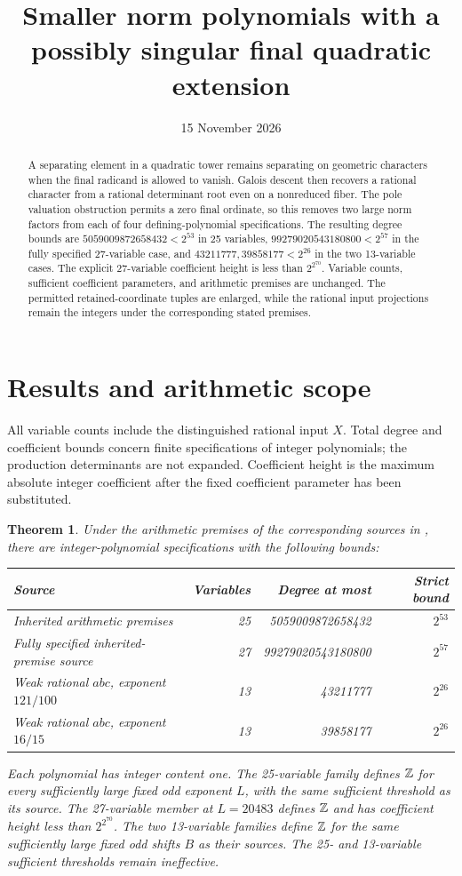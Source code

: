 \documentclass[11pt,a4paper]{article}
\title{Smaller norm polynomials with a possibly singular final quadratic extension}
\author{}\date{15 November 2026}
\newtheorem{theorem}{Theorem}[section]
\begin{document}
\maketitle
\begin{abstract}
A separating element in a quadratic tower remains separating on geometric
characters when the final radicand is allowed to vanish. Galois descent
then recovers a rational character from a rational determinant root even
on a nonreduced fiber. The pole valuation obstruction permits a zero final
ordinate, so this removes two large norm factors from each of four
defining-polynomial specifications. The resulting degree bounds are
$5059009872658432<2^{53}$ in 25 variables,
$99279020543180800<2^{57}$ in the fully specified 27-variable case,
and $43211777,39858177<2^{26}$ in the two 13-variable cases.
The explicit 27-variable coefficient height is less than $2^{2^{70}}$.
Variable counts, sufficient coefficient parameters, and arithmetic
premises are unchanged. The permitted retained-coordinate tuples are
enlarged, while the rational input projections remain the integers under
the corresponding stated premises.
\end{abstract}

\section{Results and arithmetic scope}
All variable counts include the distinguished rational input $X$.
Total degree and coefficient bounds concern finite specifications of
integer polynomials; the production determinants are not expanded.
Coefficient height is the maximum absolute integer coefficient after
the fixed coefficient parameter has been substituted.

\begin{theorem}\label{thm:main}
Under the arithmetic premises of the corresponding sources in
\cite{Unit,Subalgebra}, there are integer-polynomial specifications with
the following bounds:
\begin{center}\small
\begin{tabular}{lrrr}\toprule
Source & Variables & Degree at most & Strict bound\\\midrule
Inherited arithmetic premises &25&5059009872658432&$2^{53}$\\
Fully specified inherited-premise source &27&99279020543180800&$2^{57}$\\
Weak rational $abc$, exponent $121/100$ &13&43211777&$2^{26}$\\
Weak rational $abc$, exponent $16/15$ &13&39858177&$2^{26}$\\\bottomrule
\end{tabular}
\end{center}
Each polynomial has integer content one. The 25-variable family defines
$\mathbb Z$ for every sufficiently large fixed odd exponent $L$, with the same
sufficient threshold as its source. The 27-variable member at $L=20483$
defines $\mathbb Z$ and has coefficient height less than $2^{2^{70}}$.
The two 13-variable families define $\mathbb Z$ for the same sufficiently large
fixed odd shifts $B$ as their sources. The 25- and 13-variable sufficient
thresholds remain ineffective.
\end{theorem}
\end{document}
